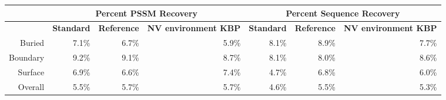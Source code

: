 
\begin{tabular}{|r||r|r|r|r|r|r|}
\hline
 & \multicolumn{3}{c}{\textbf{Percent PSSM Recovery}} & \multicolumn{3}{|c|}{\textbf{Percent Sequence Recovery}}\\
\hline
  & \textbf{Standard} & \textbf{Reference} & \textbf{NV environment KBP} & \textbf{Standard} & \textbf{Reference} & \textbf{NV environment KBP} \\
\hline
\hline
Buried & 7.1\% & 6.7\% & 5.9\% & 8.1\% & 8.9\% & 7.7\%\\
\hline
Boundary & 9.2\% & 9.1\% & 8.7\% & 8.1\% & 8.0\% & 8.6\%\\
\hline
Surface & 6.9\% & 6.6\% & 7.4\% & 4.7\% & 6.8\% & 6.0\%\\
\hline
Overall & 5.5\% & 5.7\% & 5.7\% & 4.6\% & 5.5\% & 5.3\%\\
\hline
\end{tabular}